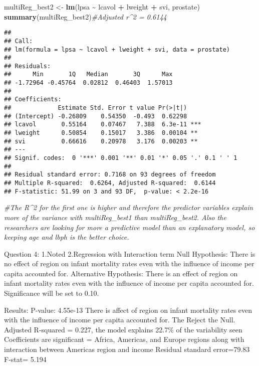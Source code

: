 \documentclass[
]{article}
\newenvironment{Shaded}{\begin{snugshade}}{\end{snugshade}}
\newcommand{\CommentTok}[1]{\textcolor[rgb]{0.56,0.35,0.01}{\textit{#1}}}
\newcommand{\FunctionTok}[1]{\textcolor[rgb]{0.13,0.29,0.53}{\textbf{#1}}}
\newcommand{\NormalTok}[1]{#1}
\newcommand{\OtherTok}[1]{\textcolor[rgb]{0.56,0.35,0.01}{#1}}
\newcommand{\SpecialCharTok}[1]{\textcolor[rgb]{0.81,0.36,0.00}{\textbf{#1}}}
\begin{document}
\begin{Shaded}
\begin{Highlighting}[]
\NormalTok{multiReg\_best2 }\OtherTok{\textless{}{-}} \FunctionTok{lm}\NormalTok{(lpsa }\SpecialCharTok{\textasciitilde{}}\NormalTok{ lcavol }\SpecialCharTok{+}\NormalTok{ lweight }\SpecialCharTok{+}\NormalTok{ svi, prostate)}
\FunctionTok{summary}\NormalTok{(multiReg\_best2)}\CommentTok{\#Adjusted r\^{}2 = 0.6144}
\end{Highlighting}
\end{Shaded}

\begin{verbatim}
## 
## Call:
## lm(formula = lpsa ~ lcavol + lweight + svi, data = prostate)
## 
## Residuals:
##      Min       1Q   Median       3Q      Max 
## -1.72964 -0.45764  0.02812  0.46403  1.57013 
## 
## Coefficients:
##             Estimate Std. Error t value Pr(>|t|)    
## (Intercept) -0.26809    0.54350  -0.493  0.62298    
## lcavol       0.55164    0.07467   7.388  6.3e-11 ***
## lweight      0.50854    0.15017   3.386  0.00104 ** 
## svi          0.66616    0.20978   3.176  0.00203 ** 
## ---
## Signif. codes:  0 '***' 0.001 '**' 0.01 '*' 0.05 '.' 0.1 ' ' 1
## 
## Residual standard error: 0.7168 on 93 degrees of freedom
## Multiple R-squared:  0.6264, Adjusted R-squared:  0.6144 
## F-statistic: 51.99 on 3 and 93 DF,  p-value: < 2.2e-16
\end{verbatim}

\begin{Shaded}
\begin{Highlighting}[]
\CommentTok{\#The R\^{}2 for the first one is higher and therefore the predictor variables explain more of the variance with multiReg\_best1 than multiReg\_best2. Also the researchers are looking for more a predictive model than an explanatory model, so keeping age and lbph is the better choice. }
\end{Highlighting}
\end{Shaded}

Question 4: 1.Noted 2.Regression with Interaction term Null Hypothesis:
There is no effect of region on infant mortality rates even with the
influence of income per capita accounted for. Alternative Hypothesis:
There is an effect of region on infant mortality rates even with the
influence of income per capita accounted for. Significance will be set
to 0.10.

Results: P-value: 4.55e-13 There is affect of region on infant mortality
rates even with the influence of income per capita accounted for. The
Reject the Null. Adjusted R-squared = 0.227, the model explains 22.7\%
of the variability seen Coefficients are significant = Africa, Americas,
and Europe regions along with interaction between Americas region and
income Residual standard error=79.83 F-stat= 5.194
\end{document}
